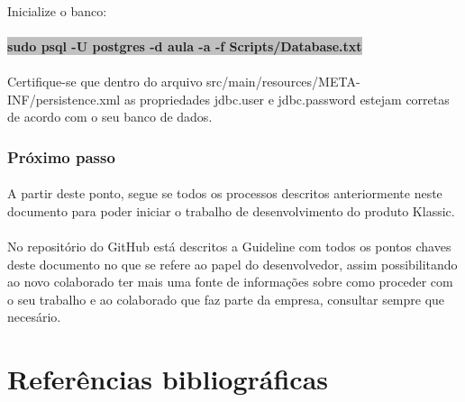 \documentclass[	DIV=calc,%
							paper=a4,%
							fontsize=12pt,%
							onecolumn]{scrartcl}	 					%
\begin{document}
\paragraph{}
Inicialize o banco:
\paragraph{}
\textbf{\colorbox{Silver}{sudo psql -U postgres -d aula -a -f Scripts/Database.txt}}
\paragraph{}
Certifique-se que dentro do arquivo src/main/resources/META-INF/persistence.xml as
propriedades jdbc.user e jdbc.password estejam corretas de acordo com o seu banco de
dados.
\subsubsection{Próximo passo}
\paragraph{}
A partir deste ponto, segue se todos os processos descritos anteriormente neste documento para poder iniciar o trabalho de desenvolvimento do produto Klassic.
\paragraph{}
No repositório do GitHub está descritos a Guideline com todos os pontos chaves deste documento no que se refere ao papel do desenvolvedor, assim possibilitando ao novo colaborado ter mais uma fonte de informações sobre como proceder com o seu trabalho e ao colaborado que faz parte da empresa, consultar sempre que necesário.


\newpage
\section{Referências bibliográficas}

 
\end{document}
